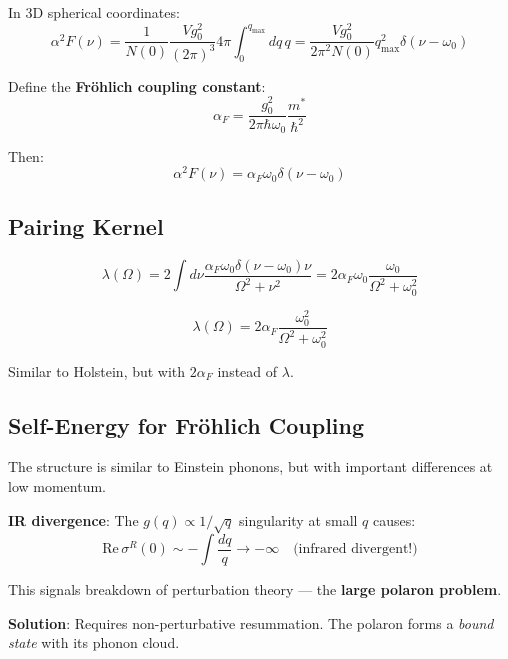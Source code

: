 \documentclass[12pt]{article}
\begin{document}
In 3D spherical coordinates:
\begin{equation}
\alpha^2F(\nu) = \frac{1}{N(0)} \frac{V g_0^2}{(2\pi)^3} 4\pi \int_0^{q_{\text{max}}} dq \, q = \frac{V g_0^2}{2\pi^2 N(0)} q_{\text{max}}^2 \delta(\nu - \omega_0)
\end{equation}

Define the \textbf{Fr\"ohlich coupling constant}:
\begin{equation}
\alpha_F = \frac{g_0^2}{2\pi\hbar\omega_0} \frac{m^*}{\hbar^2}
\end{equation}

Then:
\begin{equation}
\boxed{
\alpha^2F(\nu) = \alpha_F \omega_0 \delta(\nu - \omega_0)
}
\end{equation}

\subsection{Pairing Kernel}

\begin{equation}
\lambda(\Omega) = 2\int d\nu \frac{\alpha_F \omega_0 \delta(\nu - \omega_0) \nu}{\Omega^2 + \nu^2}
= 2\alpha_F \omega_0 \frac{\omega_0}{\Omega^2 + \omega_0^2}
\end{equation}

\begin{equation}
\boxed{
\lambda(\Omega) = 2\alpha_F \frac{\omega_0^2}{\Omega^2 + \omega_0^2}
}
\end{equation}

Similar to Holstein, but with $2\alpha_F$ instead of $\lambda$.

\subsection{Self-Energy for Fr\"ohlich Coupling}

The structure is similar to Einstein phonons, but with important differences at low momentum.

\textbf{IR divergence}: The $g(q) \propto 1/\sqrt{q}$ singularity at small $q$ causes:
\begin{equation}
\text{Re}\,\sigma^R(0) \sim -\int \frac{dq}{q} \to -\infty \quad \text{(infrared divergent!)}
\end{equation}

This signals breakdown of perturbation theory — the \textbf{large polaron problem}.

\textbf{Solution}: Requires non-perturbative resummation. The polaron forms a \textit{bound state} with its phonon cloud.
\end{document}
